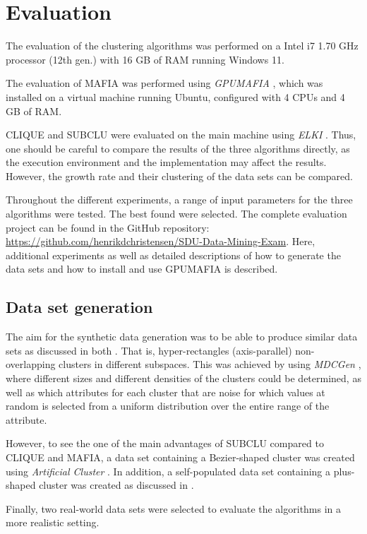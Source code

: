 \section{Evaluation}
The evaluation of the clustering algorithms was performed on a Intel i7 1.70 GHz processor (12th gen.) with 16 GB of RAM running Windows 11.

The evaluation of MAFIA was performed using \textit{GPUMAFIA} \cite{gpumafia}, which was installed on a virtual machine running Ubuntu, configured with 4 CPUs and 4 GB of RAM.

CLIQUE and SUBCLU were evaluated on the main machine using \textit{ELKI} \cite{elki}. Thus, one should be careful to compare the results of the three algorithms directly, as the execution environment and the implementation may affect the results. However, the growth rate and their clustering of the data sets can be compared.

Throughout the different experiments, a range of input parameters for the three algorithms were tested. The best found were selected. The complete evaluation project can be found in the GitHub repository: \url{https://github.com/henrikdchristensen/SDU-Data-Mining-Exam}. Here, additional experiments as well as detailed descriptions of how to generate the data sets and how to install and use GPUMAFIA is described.

\subsection{Data set generation}
The aim for the synthetic data generation was to be able to produce similar data sets as discussed in both \cite{clique,mafia}. That is, hyper-rectangles (axis-parallel) non-overlapping clusters in different subspaces. This was achieved by using \textit{MDCGen} \cite{mdcgen}, where different sizes and different densities of the clusters could be determined, as well as which attributes for each cluster that are noise for which values at random is selected from a uniform distribution over the entire range of the attribute.

However, to see the one of the main advantages of SUBCLU compared to CLIQUE and MAFIA, a data set containing a Bezier-shaped cluster was created using \textit{Artificial Cluster} \cite{ac}. In addition, a self-populated data set containing a plus-shaped cluster was created as discussed in \cite{mafia}.

Finally, two real-world data sets were selected to evaluate the algorithms in a more realistic setting.

